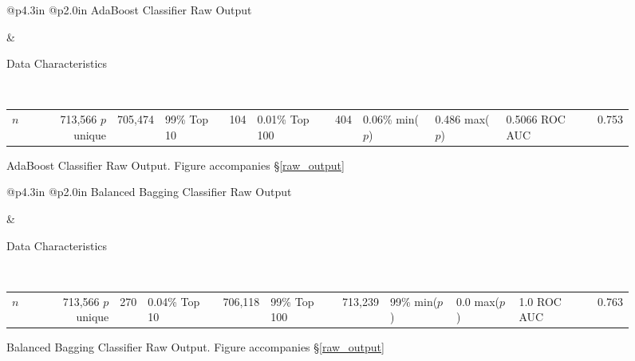 \begin{figure}[h]
\noindent\begin{tabular}{@{\hspace{-6pt}}p{4.3in} @{\hspace{-6pt}}p{2.0in}}
	\vskip 0pt
	\normalfont\normalsize
	\hfil AdaBoost Classifier Raw Output
	
		
&
	\normalfont\normalsize 
	\vskip 0pt
	
	Data Characteristics
	
	\
	
	\begin{tabular}{rrr}
		$n$ & 713,566 \cr
		$p$ unique & 705,474 & 99\% \cr
		Top 10 & 104 & 0.01\% \cr
		Top 100 & 404 & 0.06\% \cr
		min($p$) & 0.486 \cr
		max($p$) & 0.5066 \cr
		ROC AUC & 0.753 \cr
	\end{tabular}
\cr
\end{tabular}
\caption{\normalfont\normalsize AdaBoost Classifier Raw Output.  Figure accompanies \S\ref{raw_output}}
\label{AdaBoost_raw}
\end{figure}

\begin{figure}[h]

\noindent\begin{tabular}{@{\hspace{-6pt}}p{4.3in} @{\hspace{-6pt}}p{2.0in}}
	\vskip 0pt
	\normalfont\normalsize
	\hfil Balanced Bagging Classifier Raw Output
	
		
&
	\normalfont\normalsize 
	\vskip 0pt
	
	Data Characteristics
	
	\
	
	\begin{tabular}{rrr}
		$n$ & 713,566 \cr
		$p$ unique & 270 & 0.04\% \cr
		Top 10 & 706,118 & 99\% \cr
		Top 100 & 713,239 & 99\% \cr
		min($p$) & 0.0 \cr
		max($p$) & 1.0 \cr
		ROC AUC & 0.763 \cr
	\end{tabular}
\cr
\end{tabular}
\caption{\normalfont\normalsize Balanced Bagging Classifier Raw Output.  Figure accompanies \S\ref{raw_output}}
\label{BalBag_raw}
\end{figure}

